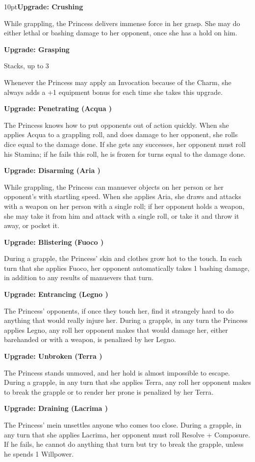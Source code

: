 \begin{myindentpar}{10pt}\textbf{Upgrade: Crushing}

While grappling, the Princess delivers immense force in her grasp. She may do either lethal or bashing damage to her opponent, once she has a hold on him.

\textbf{Upgrade: Grasping}

Stacks, up to 3

Whenever the Princess may apply an Invocation because of the Charm, she always adds a +1 equipment bonus for each time she takes this upgrade.

\textbf{Upgrade: Penetrating (Acqua \textbullet\textbullet)}

The Princess knows how to put opponents out of action quickly. When she applies Acqua to a grappling roll, and does damage to her opponent, she rolls dice equal to the damage done. If she gets any successes, her opponent must roll his Stamina; if he fails this roll, he is frozen for turns equal to the damage done.

\textbf{Upgrade: Disarming (Aria \textbullet\textbullet)}

While grappling, the Princess can manuever objects on her person or her opponent's with startling speed. When she applies Aria, she draws and attacks with a weapon on her person with a single roll; if her opponent holds a weapon, she may take it from him and attack with a single roll, or take it and throw it away, or pocket it.

\textbf{Upgrade: Blistering (Fuoco \textbullet\textbullet)}

During a grapple, the Princess' skin and clothes grow hot to the touch. In each turn that she applies Fuoco, her opponent automatically takes 1 bashing damage, in addition to any results of manuevers that turn.

\textbf{Upgrade: Entrancing (Legno \textbullet\textbullet)}

The Princess' opponents, if once they touch her, find it strangely hard to do anything that would really injure her. During a grapple, in any turn the Princess applies Legno, any roll her opponent makes that would damage her, either barehanded or with a weapon, is penalized by her Legno.

\textbf{Upgrade: Unbroken (Terra \textbullet\textbullet)}

The Princess stands unmoved, and her hold is almost impossible to escape. During a grapple, in any turn that she applies Terra, any roll her opponent makes to break the grapple or to render her prone is penalized by her Terra.

\textbf{Upgrade: Draining (Lacrima \textbullet\textbullet)}

The Princess' mein unsettles anyone who comes too close. During a grapple, in any turn that she applies Lacrima, her opponent must roll Resolve + Composure. If he fails, he cannot do anything that turn but try to break the grapple, unless he spends 1 Willpower.\end{myindentpar}

